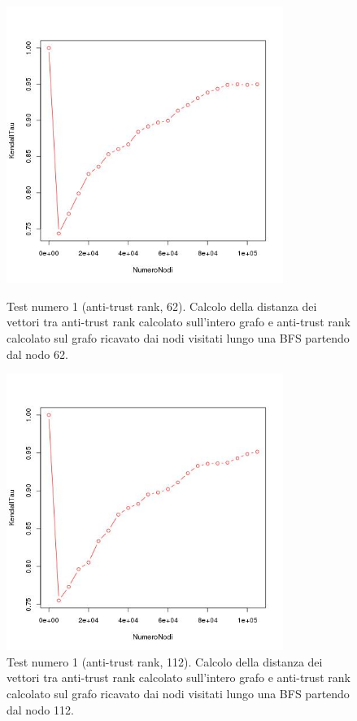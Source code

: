  \begin{figure}
\centering
 \includegraphics[height=9cm]{immagini/test1/antiTrustrankTestMode1_62}
 \caption{Test numero 1 (anti-trust rank, 62). Calcolo della distanza dei vettori tra anti-trust rank calcolato sull'intero grafo e anti-trust rank calcolato sul grafo ricavato dai nodi visitati lungo una BFS partendo dal nodo 62.}
 \label{fig:test1antitrustModoB62}
\centering
 \includegraphics[height=9cm]{immagini/test1/antiTrustrankTestMode1_112}
 \caption{Test numero 1 (anti-trust rank, 112). Calcolo della distanza dei vettori tra anti-trust rank calcolato sull'intero grafo e anti-trust rank calcolato sul grafo ricavato dai nodi visitati lungo una BFS partendo dal nodo 112.}
 \label{fig:test1antitrustModoB112}
\end{figure}

